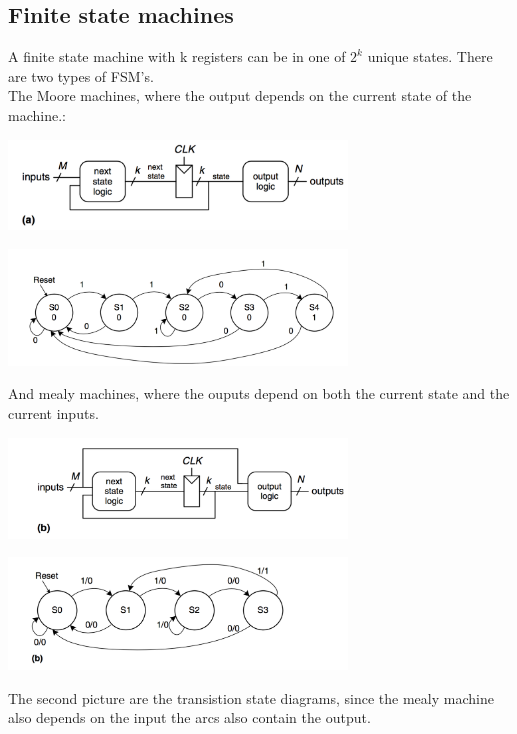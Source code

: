	\subsection{Finite state machines}
		A finite state machine with k registers can be in one of $2^k$ unique states. There are two types of FSM's.\\ The Moore machines, where the output depends on the current state of the machine.:
		\begin{center}
				\includegraphics[width = 9cm]{images/seq/moore}
		\end{center}
		\begin{center}
				\includegraphics[width = 9cm]{images/seq/moores}
		\end{center}
		And mealy machines, where the ouputs depend on both the current state and the current inputs.
		\begin{center}
				\includegraphics[width = 9cm]{images/seq/mealy}
		\end{center}
		\begin{center}
				\includegraphics[width = 9cm]{images/seq/mealys}
		\end{center}
		The second picture are the transistion state diagrams, since the mealy machine also depends on the input the arcs also contain the output.\\
